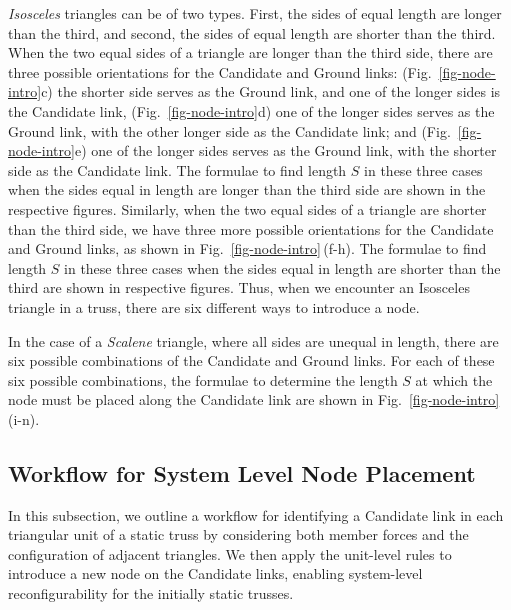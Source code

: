 \textit{Isosceles} triangles can be of two types. First, the sides of equal length are longer than the third, and second, the sides of equal length are shorter than the third. When the two equal sides of a triangle are longer than the third side, there are three possible orientations for the Candidate and Ground links:
(Fig.~\ref{fig-node-intro}c) the shorter side serves as the Ground link, and one of the longer sides is the Candidate link,
(Fig.~\ref{fig-node-intro}d) one of the longer sides serves as the Ground link, with the other longer side as the Candidate link; and
(Fig.~\ref{fig-node-intro}e) one of the longer sides serves as the Ground link, with the shorter side as the Candidate link.
The formulae to find length \(S\) in these three cases when the sides equal in length are longer than the third side are shown in the respective figures. Similarly, when the two equal sides of a triangle are shorter than the third side, we have three more possible orientations for the Candidate and Ground links, as shown in Fig.~\ref{fig-node-intro}\,(f-h). The formulae to find length \(S\) in these three cases when the sides equal in length are shorter than the third are shown in respective figures. Thus, when we encounter an Isosceles triangle in a truss, there are six different ways to introduce a node.

In the case of a \textit{Scalene} triangle, where all sides are unequal in length, there are six possible combinations of the Candidate and Ground links. For each of these six possible combinations, the formulae to determine the length \(S\) at which the node must be placed along the Candidate link are shown in Fig.~\ref{fig-node-intro}\,(i-n).

\subsection{Workflow for System Level Node Placement}\label{02-subsec-algo}
In this subsection, we outline a workflow for identifying a Candidate link in each triangular unit of a static truss by considering both member forces and the configuration of adjacent triangles. We then apply the unit-level rules to introduce a new node on the Candidate links, enabling system-level reconfigurability for the initially static trusses. 

